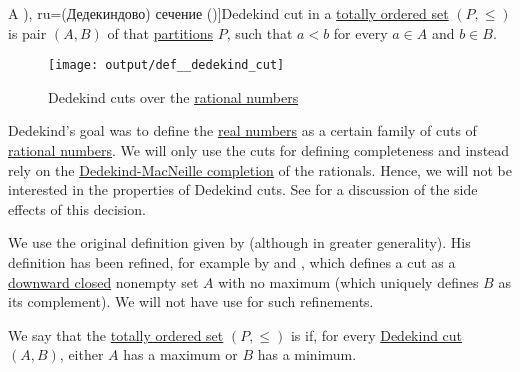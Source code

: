 \begin{definition}\label{def:dedekind_cut}
  A \term[ru=(Дедекиндово) сечение (\cite[34]{Тагамлицки1971Диф}), ru=(Дедекиндово) сечение (\cite[34]{Александров1977Топология})]{Dedekind cut} in a \hyperref[def:totally_ordered_set]{totally ordered set} \( (P, \leq) \) is pair \( (A, B) \) of  that \hyperref[def:set_partition]{partitions} \( P \), such that \( a < b \) for every \( a \in A \) and \( b \in B \).

  \begin{figure}[!ht]
    \centering
    \texttt{[image: output/def\_\_dedekind\_cut]}
    \caption{Dedekind cuts over the \hyperref[def:rational_numbers]{rational numbers}}
    \label{fig:def:dedekind_cut}
  \end{figure}
\end{definition}
\begin{comments}
  \item Dedekind's goal was to define the \hyperref[def:real_numbers]{real numbers} as a certain family of cuts of \hyperref[def:rational_numbers]{rational numbers}. We will only use the cuts for defining completeness and instead rely on the \hyperref[def:dedekind_macnielle_completion]{Dedekind-MacNeille completion} of the rationals. Hence, we will not be interested in the properties of Dedekind cuts. See  for a discussion of the side effects of this decision.

  \item We use the original definition given by  (although in greater generality). His definition has been refined, for example by  and , which defines a cut as a \hyperref[def:closed_ordered_subset]{downward closed} nonempty set \( A \) with no maximum (which uniquely defines \( B \) as its complement). We will not have use for such refinements.
\end{comments}

\begin{definition}\label{def:dedekind_completeness}
  We say that the \hyperref[def:totally_ordered_set]{totally ordered set} \( (P, \leq) \) is  if, for every \hyperref[def:dedekind_cut]{Dedekind cut} \( (A, B) \), either \( A \) has a maximum or \( B \) has a minimum.
\end{definition}

